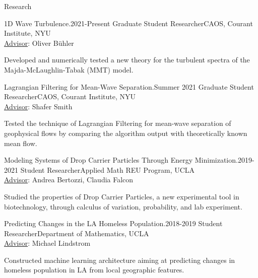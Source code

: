 \documentclass{resume} %
\begin{document}

\begin{rSection}{Research}

\begin{rSubsection}{1D Wave Turbulence.}{2021-Present}
{Graduate Student Researcher}{CAOS, Courant Institute, NYU\\\underline{Advisor}: Oliver B\"uhler}
\item Developed and numerically tested a new theory for the turbulent spectra of the Majda-McLaughlin-Tabak (MMT) model.
\end{rSubsection}

\begin{rSubsection}{Lagrangian Filtering for Mean-Wave Separation.}{Summer 2021}
{Graduate Student Researcher}{CAOS, Courant Institute, NYU\\\underline{Advisor}: Shafer Smith}
\item Tested the technique of Lagrangian Filtering for mean-wave separation of geophysical flows by comparing the algorithm output with theoretically known mean flow.
\end{rSubsection}

\begin{rSubsection}{Modeling Systems of Drop Carrier Particles Through Energy
Minimization.}{2019-2021}
{Student Researcher}{Applied Math REU Program, UCLA\\\underline{Advisor}: Andrea Bertozzi, Claudia Falcon}
\item Studied the properties of Drop Carrier Particles, a new experimental tool in biotechnology, through calculus of variation, probability, and lab experiment.
\end{rSubsection}

\begin{rSubsection}{Predicting Changes in the LA Homeless Population.}{2018-2019}
{Student Researcher}{Department of Mathematics, UCLA\\\underline{Advisor}: Michael Lindstrom}
\item Constructed machine learning architecture aiming at predicting changes in homeless population in LA from local geographic features. 
\end{rSubsection}

\end{rSection}

\end{document}
